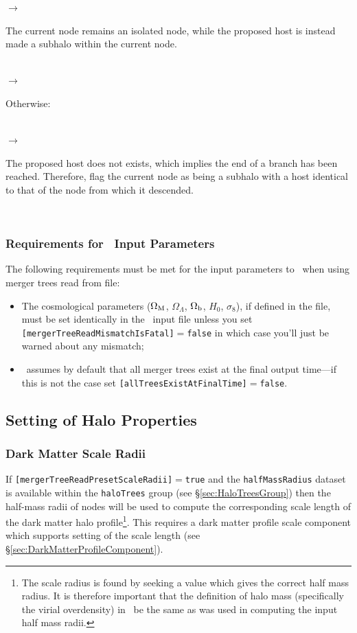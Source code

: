 \begin{itemize}
\noindent\hspace{30mm} $\rightarrow$ \parbox[t]{125mm}{The current node remains an isolated node, while the proposed host is instead made a subhalo within the current node.}\\

\noindent\hspace{20mm} $\rightarrow$ \parbox[t]{135mm}{Otherwise:}\\

\noindent\hspace{25mm} $\rightarrow$ \parbox[t]{130mm}{The proposed host does not exists, which implies the end of a branch has been reached. Therefore, flag the current node as being a subhalo with a host identical to that of the node from which it descended.}\\
\end{itemize}

\subsubsection{Requirements for \glc\ Input Parameters}

The following requirements must be met for the input parameters to \glc\ when using merger trees read from file:
\begin{itemize}
 \item The cosmological parameters ($\Omega_{\rm M}$, $\Omega_\Lambda$, $\Omega_{\rm b}$, $H_0$, $\sigma_8$), if defined in the file, must be set identically in the \glc\ input file unless you set {\tt [mergerTreeReadMismatchIsFatal]}$=${\tt false} in which case you'll just be warned about any mismatch;
 \item \glc\ assumes by default that all merger trees exist at the final output time---if this is not the case set {\tt [allTreesExistAtFinalTime]}$=${\tt false}.
\end{itemize}

\subsection{Setting of Halo Properties}

\subsubsection{Dark Matter Scale Radii}

If {\tt [mergerTreeReadPresetScaleRadii]}$=${\tt true} and the {\tt halfMassRadius} dataset is available within the {\tt haloTrees} group (see \S\ref{sec:HaloTreesGroup}) then the half-mass radii of nodes will be used to compute the corresponding scale length of the dark matter halo profile\footnote{The scale radius is found by seeking a value which gives the correct half mass radius. It is therefore important that the definition of halo mass (specifically the virial overdensity) in \protect\glc\ be the same as was used in computing the input half mass radii.}. This requires a dark matter profile scale component which supports setting of the scale length (see \S\ref{sec:DarkMatterProfileComponent}).

